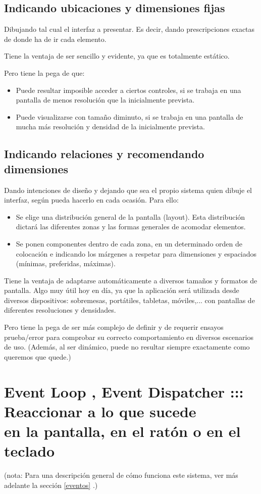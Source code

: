 \documentclass[spanish,12pt,a4paper,final,oneside]{book}
\begin{document}
\subsection{Indicando ubicaciones y dimensiones fijas}
Dibujando tal cual el interfaz a presentar. Es decir, dando prescripciones exactas de donde ha de ir cada elemento.

Tiene la ventaja de ser sencillo y evidente, ya que es totalmente estático.

Pero tiene la pega de que:
\begin{itemize}
\item Puede resultar imposible acceder a ciertos controles, si se trabaja en una pantalla de menos resolución que la inicialmente prevista.
\item Puede visualizarse con tamaño diminuto, si se trabaja en una pantalla de mucha más resolución y densidad de la inicialmente prevista.
\end{itemize}

\subsection{Indicando relaciones y recomendando dimensiones}
Dando intenciones de diseño y dejando que sea el propio sistema quien dibuje el interfaz, según pueda hacerlo en cada ocasión. Para ello:
\begin{itemize}
\item Se elige una distribución general de la pantalla (layout). Esta distribución dictará las diferentes zonas y las formas generales de acomodar elementos.
\item Se ponen componentes dentro de cada zona, en un determinado orden de colocación e indicando los márgenes a respetar para dimensiones y espaciados (mínimas, preferidas, máximas).
\end{itemize}

Tiene la ventaja de adaptarse automáticamente a diversos tamaños y formatos de pantalla. Algo muy útil hoy en día, ya que la aplicación será utilizada desde diversos dispositivos: sobremesas, portátiles, tabletas, móviles,... con pantallas de diferentes resoluciones y densidades.

Pero tiene la pega de ser más complejo de definir y de requerir ensayos prueba/error para comprobar su correcto comportamiento en diversos escenarios de uso. (Además, al ser dinámico, puede no resultar siempre exactamente como queremos que quede.)

\section{Event Loop , Event Dispatcher ::: Reaccionar a lo que sucede \\ en la pantalla, en el ratón o en el teclado}
(nota: Para una descripción general de cómo funciona este sistema, ver más adelante la sección \ref{eventos} .)
\end{document}
